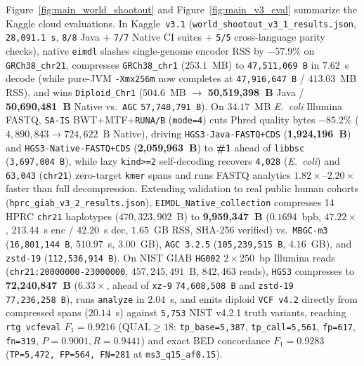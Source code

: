 \documentclass[10pt]{article}
\begin{document}
Figure~\ref{fig:main_world_shootout} and Figure~\ref{fig:main_v3_eval} summarize the Kaggle cloud evaluations. In Kaggle~\texttt{v3.1} (\texttt{world\_shootout\_v3\_1\_results.json}, \texttt{28,091.1~s}, \texttt{8/8} Java + \texttt{7/7} Native CI suites + \texttt{5/5} cross-language parity checks), native \texttt{eimdl} slashes single-genome encoder RSS by $-57.9\%$ on \texttt{GRCh38\_chr21}, compresses \texttt{GRCh38\_chr1} ($253.1$~MB) to \texttt{47,511,069~B} in $7.62$~s decode (while pure-JVM \texttt{-Xmx256m} now completes at \texttt{47,916,647~B} / $413.03$~MB RSS), and wins \texttt{Diploid\_Chr1} ($504.6$~MB $\to$ \textbf{50,519,398~B} Java / \textbf{50,690,481~B} Native vs.\ \texttt{AGC} \texttt{57,748,791~B}). On $34.17$~MB \textit{E.~coli} Illumina FASTQ, \texttt{SA-IS} BWT+MTF+\texttt{RUNA/B} (\texttt{mode=4}) cuts Phred quality bytes $-85.2\%$ ($4,890,843 \to 724,622$~B Native), driving \texttt{HGS3-Java-FASTQ+CDS} (\textbf{1,924,196~B}) and \texttt{HGS3-Native-FASTQ+CDS} (\textbf{2,059,963~B}) to \textbf{\#1} ahead of \texttt{libbsc} (\texttt{3,697,004~B}), while lazy \texttt{kind>=2} self-decoding recovers \texttt{4,028} (\textit{E.~coli}) and \texttt{63,043} (\texttt{chr21}) zero-target \texttt{kmer} spans and runs FASTQ analytics $1.82\times\text{--}2.20\times$ faster than full decompression. Extending validation to real public human cohorts (\texttt{hprc\_giab\_v3\_2\_results.json}), \texttt{EIMDL\_Native\_collection} compresses 14 HPRC \texttt{chr21} haplotypes ($470,323,902$~B) to \textbf{9,959,347~B} ($0.1694$~bpb, $47.22\times$, $213.44$~s enc / $42.20$~s dec, $1.65$~GB RSS, SHA-256 verified) vs.\ \texttt{MBGC-m3} (\texttt{16,801,144~B}, $510.97$~s, $3.00$~GB), \texttt{AGC~3.2.5} (\texttt{105,239,515~B}, $4.16$~GB), and \texttt{zstd-19} (\texttt{112,536,914~B}). On NIST GIAB \texttt{HG002} $2\times 250$~bp Illumina reads (\texttt{chr21:20000000-23000000}, $457,245,491$~B, $842{,}463$ reads), \texttt{HGS3} compresses to \textbf{72,240,847~B} ($6.33\times$, ahead of \texttt{xz-9} \texttt{74,608,508~B} and \texttt{zstd-19} \texttt{77,236,258~B}), runs \texttt{analyze} in $2.04$~s, and emits diploid \texttt{VCF~v4.2} directly from compressed spans ($20.14$~s) against \texttt{5,753} NIST v4.2.1 truth variants, reaching \texttt{rtg vcfeval} \textbf{$F_1=0.9216$} ($\text{QUAL}\ge 18$: \texttt{tp\_base=5,387}, \texttt{tp\_call=5,561}, \texttt{fp=617}, \texttt{fn=319}, $P=0.9001, R=0.9441$) and exact BED concordance \textbf{$F_1=0.9283$} (\texttt{TP=5,472, FP=564, FN=281} at \texttt{ms3\_q15\_af0.15}).
\end{document}
